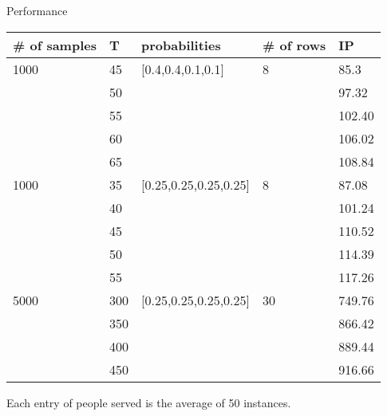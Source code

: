   \begin{frame}{Performance}
    \scriptsize
    \begin{table}[ht]
        \begin{tabular}{|l|l|l|l|l|}
        \hline
        \# of samples & T & probabilities & \# of rows &  IP \\
        \hline
        1000  & 45  & [0.4,0.4,0.1,0.1] & 8  & 85.3 \\
          & 50  &  &   & 97.32 \\
          & 55  &  &   & 102.40  \\ %
          & 60  &  &   & 106.02  \\
         & 65  &  &   & 108.84 \\
        \hline
        1000  & 35  & [0.25,0.25,0.25,0.25] & 8  & 87.08 \\
          & 40  &  &   & 101.24 \\
          & 45  &  &   & 110.52 \\
          & 50  &  &   & 114.39 \\
          & 55  &  &   & 117.26 \\
        \hline
        5000  & 300  & [0.25,0.25,0.25,0.25] & 30  & 749.76 \\
         & 350  &  &   & 866.42 \\
          & 400  &  &   & 889.44 \\
          & 450  &  &   & 916.66 \\
        \hline
        \end{tabular}
    \end{table}
  
  Each entry of people served is the average of 50 instances.
  \end{frame}

